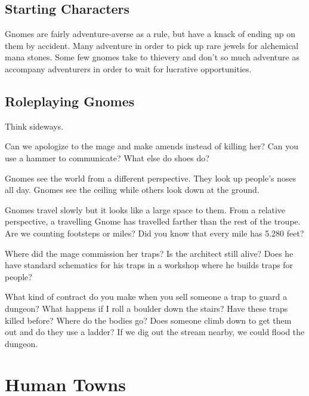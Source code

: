 \begin{multicols}{2}
\subsection{Starting Characters}
Gnomes are fairly adventure-averse as a rule, but have a knack of ending up on them by accident. Many adventure in order to pick up rare jewels for alchemical mana stones. Some few gnomes take to thievery and don't so much adventure as accompany adventurers in order to wait for lucrative opportunities.

\subsection{Roleplaying Gnomes}

{\raggedleft Think sideways.\par}
\noindent
Can we apologize to the mage and make amends instead of killing her?
Can you use a hammer to communicate?
What else do shoes do?

Gnomes see the world from a different perspective.
They look up people's noses all day.
Gnomes see the ceiling while others look down at the ground.

Gnomes travel slowly but it looks like a large space to them.
From a relative perspective, a travelling Gnome has travelled farther than the rest of the troupe.
Are we counting footsteps or miles?
Did you know that every mile has 5.280 feet?

Where did the mage commission her traps?
Is the architect still alive?
Does he have standard schematics for his traps in a workshop where he builds traps for people?

What kind of contract do you make when you sell someone a trap to guard a dungeon?
What happens if I roll a boulder down the stairs?
Have these traps killed before?
Where do the bodies go?
Does someone climb down to get them out and do they use a ladder?
If we dig out the stream nearby, we could flood the dungeon.

\end{multicols}

\section[Humans]{Human Towns \Hu}

